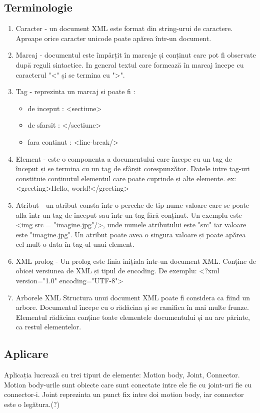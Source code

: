 \subsection{Terminologie}

\begin{enumerate}[wide=0pt, listparindent=1.25em, parsep=0pt]
    \item Caracter - un document XML este format din string-urui de caractere. Aproape orice caracter unicode poate apărea într-un document.
    \item Marcaj - documentul este împărțit în marcaje și conținut care pot fi observate după reguli sintactice. In general textul care formează în marcaj începe cu caracterul "<" și se termina cu ">". 
    \item Tag - reprezinta un marcaj si poate fi :
    \begin{itemize}
        \item de inceput : <sectiune>
        \item de sfarsit : </sectiune>
        \item fara continut : <line-break/> 
    \end{itemize}
    \item Element - este o componenta a documentului care începe cu un tag de început și se termina cu un tag de 
    sfârșit corespunzător. Datele intre tag-uri constituie conținutul elementul care poate cuprinde și alte elemente.\newline 
    ex:<greeting>Hello, world!</greeting>
    \item Atribut - un atribut consta într-o pereche de tip nume-valoare care se poate afla într-un tag de început sau 
    într-un tag fără conținut.\newline 
    Un exemplu este <img src = "imagine.jpg"/>, unde numele atributului este "src" iar valoare 
    este "imagine.jpg". Un atribut poate avea o singura valoare și poate apărea cel mult o data în tag-ul unui element. 
    \item XML prolog - Un prolog este linia inițiala într-un document XML. Conține de obicei versiunea de XML și tipul de encoding.\newline 
    De exemplu: <?xml version="1.0" encoding="UTF-8">
    \item Arborele XML Structura unui document XML poate fi considera ca fiind un arbore. 
    Documentul începe cu o rădăcina și se ramifica în mai multe frunze. 
    Elementul rădăcina conține toate elementele documentului și nu are părinte, ca restul elementelor.
\end{enumerate} 

\subsection{Aplicare}
Aplicația lucrează cu trei tipuri de elemente: Motion body, Joint, Connector. 
Motion body-urile sunt obiecte care sunt conectate intre ele fie cu joint-uri fie cu connector-i. 
Joint reprezinta un punct fix intre doi motion body, iar connector este o legătura.(?)
